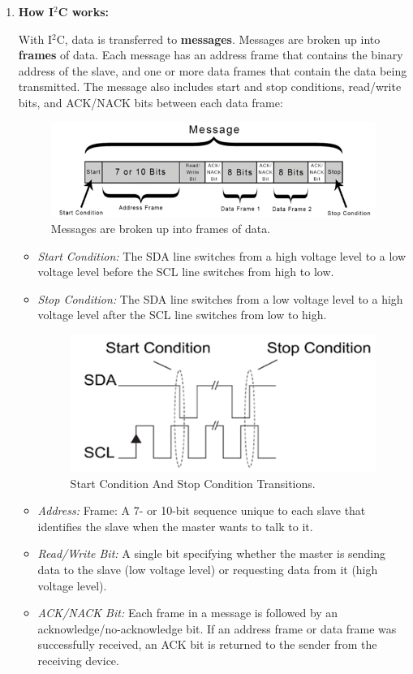 \begin{enumerate}[label=\alph*) ]
	\item \textbf{How I$^2$C works:}
	
	With I$^{2}$C, data is transferred to \textbf{messages}. Messages are broken up into \textbf{frames} of data. Each message has an address frame that contains the binary address of the slave, and one or more data frames that contain the data being transmitted. The message also includes start and stop conditions, read/write bits, and ACK/NACK bits between each data frame:

	\begin{figure}[H]
		\centering
		\includegraphics[width=0.7\linewidth]{./my-chapters/my-images/theoretical_background/TWI_Messages are broken up into frames of data.png}
		\caption{Messages are broken up into frames of data.}
		\label{fig: TWI_Messages are broken up into frames of data}
	\end{figure}
	
	\begin{itemize}[label=-]
		\item \textit{Start Condition:} The SDA line switches from a high voltage level to a low voltage level before the SCL line switches from high to low.
		\item \textit{Stop Condition:} The SDA line switches from a low voltage level to a high voltage level after the SCL line switches from low to high.
		
		\begin{figure}[H]
			\centering
			\includegraphics[width=0.7\linewidth]{./my-chapters/my-images/theoretical_background/TWI_start_condition.png}
			\caption{Start Condition And Stop Condition Transitions.}
			\label{fig: TWI_start_condition}
		\end{figure}
		
		\item \textit{Address:} Frame: A 7- or 10-bit sequence unique to each slave that identifies the slave when the master wants to talk to it.
		\item \textit{Read/Write Bit:} A single bit specifying whether the master is sending data to the slave (low voltage level) or requesting data from it (high voltage level).
		\item \textit{ACK/NACK Bit:} Each frame in a message is followed by an acknowledge/no-acknowledge bit. If an address frame or data frame was successfully received, an ACK bit is returned to the sender from the receiving device.
	\end{itemize}
	

\end{enumerate}
